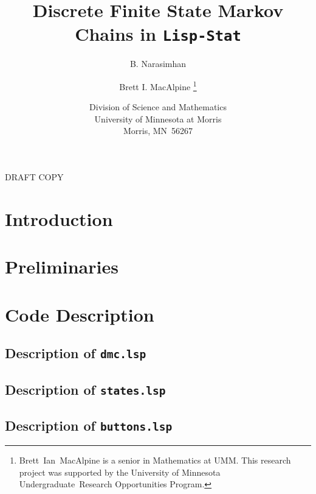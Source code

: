 
\title{Discrete Finite State Markov Chains in {\tt Lisp-Stat}}

\author{B. Narasimhan
  \and
  Brett I. MacAlpine
  \thanks{Brett~Ian~MacAlpine is a senior in
    Mathematics at UMM.  This research project was supported by
    the University of Minnesota Undergraduate~Research
    Opportunities Program.}\\ 
  \and
  Division of Science and Mathematics\\
  University of Minnesota at Morris\\
  Morris, MN~56267}


\maketitle
\begin{center}
{\sc DRAFT COPY}
\end{center}
\begin{abstract}
 
\end{abstract}

\section{Introduction}
\label{sec:intro}


\section{Preliminaries}
\label{sec:prelim}


\section{Code Description}
\label{sec:codedesc}


\subsection{Description of {\tt dmc.lsp}}
\label{subsec:dmc}


\subsection{Description of {\tt states.lsp}}
\label{subsec:states}


\subsection{Description of {\tt buttons.lsp}}
\label{subsec:buttons}
 
 
